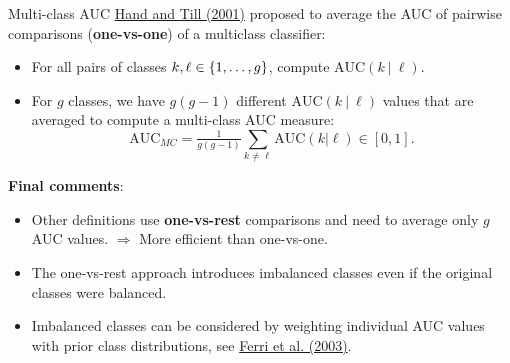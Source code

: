 

\begin{vbframe}{Multi-class AUC}
\href{https://link.springer.com/article/10.1023/A:1010920819831}{Hand and Till (2001)} proposed to average the AUC of pairwise comparisons (\textbf{one-vs-one}) of a multiclass classifier:

\begin{itemize}
    \item For all pairs of classes $k, \ell \in \{1, \ldots, g\}$, compute $\text{AUC}(k ~|~ \ell)$.
    \item For $g$ classes, we have $g (g-1)$ different $\text{AUC}(k ~|~ \ell)$ values that are averaged to compute a multi-class AUC measure:
    $$\text{AUC}_{MC} = \tfrac{1}{g(g - 1)} \sum_{k \neq \ell} \text{AUC}(k | \ell) \in [0, 1].$$
\end{itemize}

\textbf{Final comments}:

\begin{itemize}
\item Other definitions use \textbf{one-vs-rest} comparisons and need to average only $g$ AUC values. $\Rightarrow$ More efficient than one-vs-one.
\item The one-vs-rest approach introduces imbalanced classes even if the original classes were balanced.
\item Imbalanced classes can be considered by weighting individual AUC values with prior class distributions, see \href{https://doi.org/10.1016/j.patrec.2008.08.010}{Ferri et al. (2003)}.
\end{itemize}

\end{vbframe}

